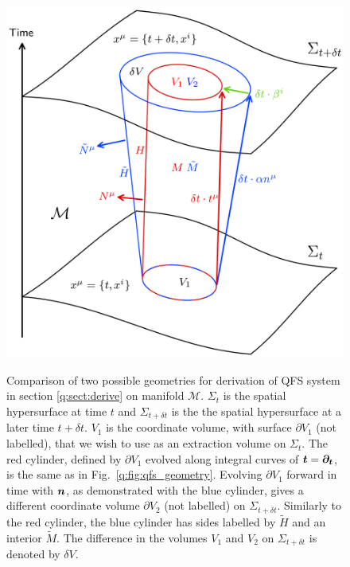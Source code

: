 \begin{figure}[h]
{\includegraphics[width=0.6\columnwidth]{png/qfs_coloured.png}}
\caption{Comparison of two possible geometries for derivation of QFS system in section \ref{q:sect:derive} on manifold $\mathcal{M}$. $\Sigma_t$ is the spatial hypersurface at time $t$ and $\Sigma_{t+\delta t}$ is the the spatial hypersurface at a later time $t+\delta t$. $V_1$ is the coordinate volume, with surface $\partial V_1$ (not labelled), that we wish to use as an extraction volume on $\Sigma_t$. The red cylinder, defined by $\partial V_1$ evolved along integral curves of $\boldsymbol{t}=\boldsymbol{\partial_t}$, is the same as in Fig.~\ref{q:fig:qfs_geometry}. Evolving $\partial V_1$ forward in time with $\boldsymbol n$, as demonstrated with the blue cylinder, gives a different coordinate volume $\partial V_2$ (not labelled) on $\Sigma_{t+\delta t}$. Similarly to the red cylinder, the blue cylinder has sides labelled by $\tilde{H}$ and an interior $\tilde{M}$. The difference in the volumes $V_1$ and $V_2$ on $\Sigma_{t+\delta t}$ is denoted by $\delta V.$ }
\label{q:fig:qfs_comparison}
\end{figure}

